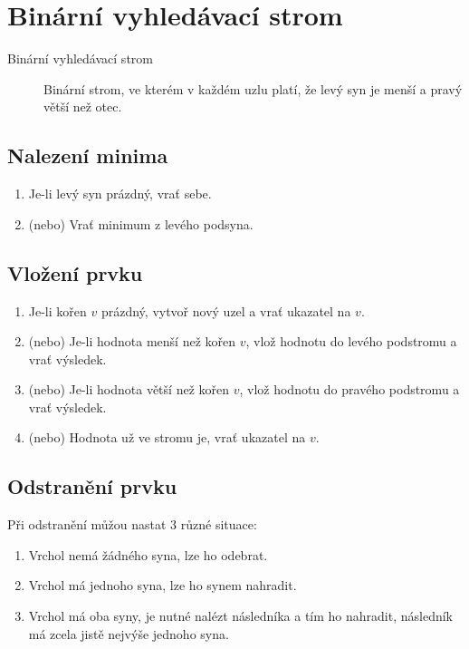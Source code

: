 \section{Binární vyhledávací strom}

  \begin{description}
    \item[Binární vyhledávací strom] Binární strom, ve kterém v každém uzlu platí, že levý syn je menší a pravý větší než otec.
  \end{description}

  \subsection{Nalezení minima}
    \begin{enumerate}
      \item Je-li levý syn prázdný, vrať sebe.
      \item (nebo) Vrať minimum z levého podsyna.
    \end{enumerate}

  \subsection{Vložení prvku}
    \begin{enumerate}
      \item Je-li kořen $v$ prázdný, vytvoř nový uzel a vrať ukazatel na $v$.
      \item (nebo) Je-li hodnota menší než kořen $v$, vlož hodnotu do levého podstromu a vrať výsledek.
      \item (nebo) Je-li hodnota větší než kořen $v$, vlož hodnotu do pravého podstromu a vrať výsledek.
      \item (nebo) Hodnota už ve stromu je, vrať ukazatel na $v$.
    \end{enumerate}

  \subsection{Odstranění prvku}
    Při odstranění můžou nastat 3 různé situace:
    \begin{enumerate}
      \item Vrchol nemá žádného syna, lze ho odebrat.
      \item Vrchol má jednoho syna, lze ho synem nahradit.
      \item Vrchol má oba syny, je nutné nalézt následníka a tím ho nahradit, následník má zcela jistě nejvýše jednoho syna.
    \end{enumerate}

